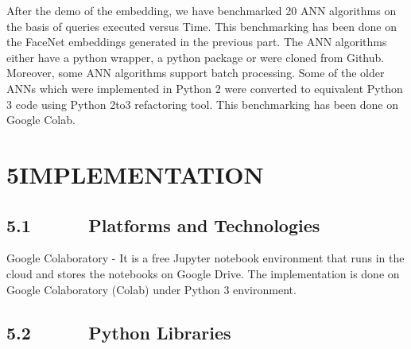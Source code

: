 \documentclass[12pt]{article}
\renewcommand{\_}{\kern-1.5pt\textunderscore\kern-1.5pt}
\begin{document}
\begin{justify}
After the demo of the embedding, we have benchmarked 20 ANN algorithms on the basis of queries executed versus Time. This benchmarking has been done on the FaceNet embeddings \cite{schroff2015facenet}  generated in the previous part. The ANN algorithms either have a python wrapper, a python package or were cloned from Github. Moreover, some ANN algorithms support batch processing. Some of the older ANNs which were implemented in Python 2 were converted to equivalent Python 3 code using Python 2to3 refactoring tool. This benchmarking has been done on Google Colab.
\end{justify}\par


\section*{5\hspace*{10pt}IMPLEMENTATION}
\subsection*{5.1\ \ \ \ \ \  Platforms and Technologies}
Google Colaboratory - It is a free Jupyter notebook environment that runs in the cloud and stores the notebooks on Google Drive. The implementation is done on Google Colaboratory (Colab) under Python 3 environment.\par

\subsection*{5.2\ \ \ \ \ \  Python Libraries}
\end{document}
